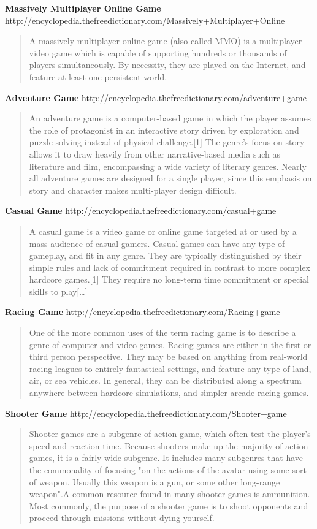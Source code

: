 \documentclass{article}
\begin{document}
\textbf{Massively Multiplayer Online Game}		
	http://encyclopedia.thefreedictionary.com/Massively+Multiplayer+Online
\begin{quote}
A massively multiplayer online game (also called MMO) is a multiplayer video
game which is capable of supporting hundreds or thousands of players
simultaneously. By necessity, they are played on the Internet, and feature at
least one persistent world.
\end{quote}
	
\textbf{Adventure Game}		
	http://encyclopedia.thefreedictionary.com/adventure+game
\begin{quote}
An adventure game is a computer-based game in which the player assumes the role
of protagonist in an interactive story driven by exploration and puzzle-solving
instead of physical challenge.[1] The genre's focus on story allows it to draw
heavily from other narrative-based media such as literature and film,
encompassing a wide variety of literary genres. Nearly all adventure games are
designed for a single player, since this emphasis on story and character makes
multi-player design difficult.
\end{quote}

\textbf{Casual Game}		
	http://encyclopedia.thefreedictionary.com/casual+game
\begin{quote}
A casual game is a video game or online game targeted at or used by a mass
audience of casual gamers. Casual games can have any type of gameplay, and fit
in any genre. They are typically distinguished by their simple rules and lack of
commitment required in contrast to more complex hardcore games.[1] They require
no long-term time commitment or special skills to play[\ldots]
\end{quote}

\textbf{Racing Game}
	http://encyclopedia.thefreedictionary.com/Racing+game
\begin{quote}
One of the more common uses of the term racing game is to describe a genre of
computer and video games. Racing games are either in the first or third person
perspective. They may be based on anything from real-world racing leagues to
entirely fantastical settings, and feature any type of land, air, or sea
vehicles. In general, they can be distributed along a spectrum anywhere between
hardcore simulations, and simpler arcade racing games.
\end{quote}
\textbf{Shooter Game}
	http://encyclopedia.thefreedictionary.com/Shooter+game
\begin{quote}
Shooter games are a subgenre of action game, which often test the player's speed
and reaction time. Because shooters make up the majority of action games, it is
a fairly wide subgenre. It includes many subgenres that have the commonality of
focusing "on the actions of the avatar using some sort of weapon. Usually this
weapon is a gun, or some other long-range weapon".A common resource found in
many shooter games is ammunition. Most commonly, the purpose of a shooter
game is to shoot opponents and proceed through missions without dying yourself.
\end{quote}
	
\end{document}

